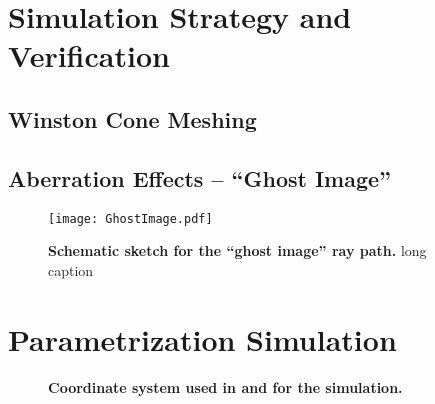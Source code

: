 \section{Simulation Strategy and Verification}

\subsection{Winston Cone Meshing}\label{sec:wico_meshing}

\subsection{Aberration Effects -- \enquote{Ghost Image}}\label{sec:ghost_image}

\begin{figure}[H]
	\centering
	\texttt{[image: GhostImage.pdf]}
	\caption[Schematic sketch for the \enquote{ghost image} ray path]{\textbf{Schematic sketch for the \enquote{ghost image} ray path.} long caption}
	\label{ghostimage_path}
\end{figure}

\section{Parametrization Simulation}

\begin{figure}[H]
	\centering
	\begin{subfigure}[t]{0.49\textwidth}
	\end{subfigure}
	\hfill
	\begin{subfigure}[t]{0.49\textwidth}
		\usebox{\savedimage}
	\end{subfigure}
	\caption[Coordinate system used in \geant and for the simulation]{\textbf{Coordinate system used in \geant and for the simulation.} }
	\label{geant_coords}
\end{figure}